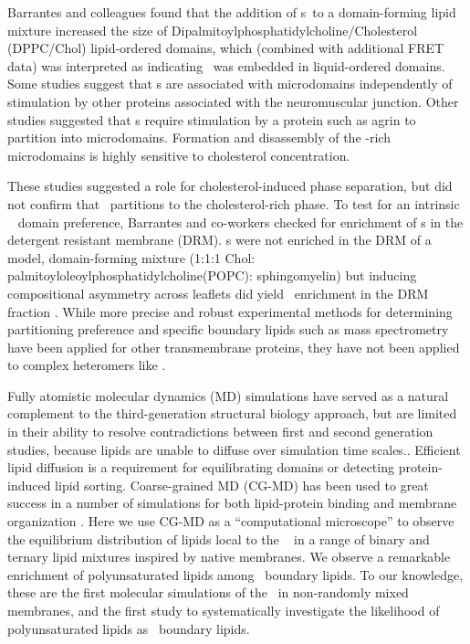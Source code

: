 Barrantes and colleagues\citep{Wenz2005} found that the addition of \nachr s~to a domain-forming lipid mixture increased the size of Dipalmitoylphosphatidylcholine/Cholesterol (DPPC/Chol) lipid-ordered domains, which (combined with additional FRET data) was interpreted as indicating \nachr~was embedded in liquid-ordered domains.  Some studies \citep{Marchand2002,Stetzkowski-Marden2006,Willmann2006} suggest that \nachr s are associated with microdomains independently of stimulation by other proteins associated with the neuromuscular junction. Other studies\citep{Zhu2006a,Campagna2006} suggested that \nachr s require stimulation by a protein such as agrin to partition into microdomains. Formation and disassembly of the \nachr-rich microdomains is highly sensitive to cholesterol concentration.\citep{Barrantes2007,Bruses2001,Marchand2002,Zhu2006a,Pun2002}

These studies suggested a role for cholesterol-induced phase separation, but did not confirm that \nachr~partitions to the cholesterol-rich phase.  To test for an intrinsic \nachr~ domain preference, Barrantes and co-workers checked for enrichment of \nachr s in the detergent resistant membrane (DRM).   \nachr s were not enriched in the DRM of a model, domain-forming mixture (1:1:1  Chol: palmitoyloleoylphosphatidylcholine(POPC): sphingomyelin) \citep{Bermdez_Partition_2010} but inducing compositional asymmetry across leaflets did yield \nachr~enrichment in the DRM fraction \citep{Perillo2016}.  While more precise and robust experimental methods for determining partitioning preference and specific boundary lipids such as mass spectrometry have been applied for other transmembrane proteins\citep{Gupta2018,Chorev2018}, they have not been applied to complex heteromers like \nachr.  

Fully atomistic molecular dynamics (MD) simulations\citep{Brannigan2008, Cheng2009, Hnin_A_2014, Carswell_Role_2015} have served as a natural complement to the third-generation structural biology approach, but are limited in their ability to resolve contradictions between first and second generation studies, because lipids are unable to diffuse over simulation time scales.\citep{Ingolfsson2014,Bond2006,Parton2013,Goose2013,Scott2008}.   Efficient lipid diffusion is a requirement for equilibrating domains or detecting protein-induced lipid sorting.    Coarse-grained MD (CG-MD) has been used to great success in a number of simulations for both lipid-protein binding and membrane organization \citep{Bond2006,Scott2008,Parton2013,Goose2013,Iyer2018,Sodt2014}. Here we use CG-MD as a ``computational microscope'' to observe the equilibrium distribution of lipids local to the \nachr~ in a range of binary and ternary lipid mixtures inspired by native membranes.   We observe a remarkable enrichment of polyunsaturated lipids among \nachr~boundary lipids. To our knowledge, these are the first molecular simulations of the \nachr~in non-randomly mixed membranes, and the first study to systematically investigate the likelihood of polyunsaturated lipids as \nachr~boundary lipids.  

